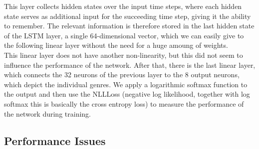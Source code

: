     This layer collects hidden states over the input time steps, where each hidden state serves as additional input for the succeeding time step, giving it the ability to remember.
    The relevant information is therefore stored in the last hidden state of the LSTM layer, a single 64-dimensional vector, which we can easily give to the following linear layer without the need for a huge amoung of weights.\\
    This linear layer does not have another non-linearity, but this did not seem to influence the performance of the network.
    After that, there is the last linear layer, which connects the 32 neurons of the previous layer to the 8 output neurons, which depict the individual genres.
    We apply a logarithmic softmax function to the output and then use the NLLLoss (negative log likelihood, together with log softmax this is basically the cross entropy loss) to measure the performance of the network during training.\\

    \subsection{Performance Issues}

